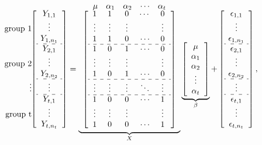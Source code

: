 \documentclass{article}
\theoremstyle{break}
\begin{document}
\[
\left[
\begin{array}{c}
Y_{1,1} \\
\llap{\text{group }1\qquad}\vdots \\
Y_{1,n_1} \\
\hdashline
Y_{2,1} \\
\llap{\text{group }2\qquad}\vdots \\
Y_{2,n_2} \\
\hdashline
\llap{\vdots\qquad}\vdots \\
\hdashline
Y_{t,1} \\
\llap{\text{group }t\qquad}\vdots \\
Y_{t,n_t}
\end{array}
\right]
=
\raisebox{1ex}{$\displaystyle
\underbrace{
\begin{array}{c}
\begin{array}{ccccc}
\mu & \alpha_1 & \alpha_2 & \cdots & \alpha_t
\end{array}\\[-0.25em]
\left[
\begin{array}{ccccc}
\mathmakebox[\widthof{$\mu$}]{1}
    & \mathmakebox[\widthof{$\alpha_1$}]{1}
    & \mathmakebox[\widthof{$\alpha_2$}]{0}
    & \mathmakebox[\widthof{$\cdots$}]{\cdots}
    & \mathmakebox[\widthof{$\alpha_t$}]{0} \\
\vdots & \vdots & \vdots & & \vdots \\
1 & 1 & 0 & \cdots & 0 \\
\hdashline
1 & 0 & 1 & \cdots & 0 \\
\vdots & \vdots & \vdots & & \vdots \\
1 & 0 & 1 & \cdots & 0 \\
\hdashline
\vdots & \vdots & \vdots & \ddots & \vdots \\
\hdashline
1 & 0 & 0 & \cdots & 1 \\
\vdots & \vdots & \vdots & & \vdots \\
1 & 0 & 0 & \cdots & 1
\end{array}
\right]
\end{array}
}_{X}
$}
\underbrace{
\left[
\begin{array}{c}
\mu \\
\alpha_1 \\
\alpha_2 \\
\vdots \\
\alpha_t
\end{array}
\right]
}_{\beta}
+
\left[
\begin{array}{c}
\epsilon_{1,1} \\
\vdots \\
\epsilon_{1,n_1} \\
\hdashline
\epsilon_{2,1} \\
\vdots \\
\epsilon_{2,n_2} \\
\hdashline
\vdots \\
\hdashline
\epsilon_{t,1} \\
\vdots \\
\epsilon_{t,n_t}
\end{array}
\right],
\]
\end{document}
